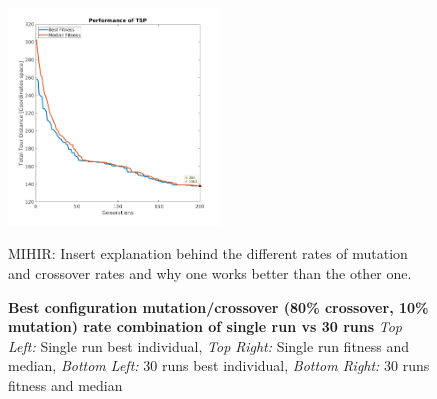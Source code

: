 \documentclass{article}
\begin{document}
\begin{figure}[h!]
		\includegraphics[width=0.5\textwidth]{img/cross_80_mut_10_fit_med_30_runs.png}
		\caption
		{
		\textbf{Best configuration mutation/crossover (80\% crossover, 10\% mutation) rate combination of single run vs 30 runs}\newline
		\textit{Top Left:} Single run best individual,
		\textit{Top Right:} Single run fitness and median, 
		\textit{Bottom Left:} 30 runs best individual, 
		\textit{Bottom Right:} 30 runs fitness and median
		}
\newpage
MIHIR: Insert explanation behind the different rates of mutation and crossover rates and why one works better than the other one.

\end{figure}
\end{document}
